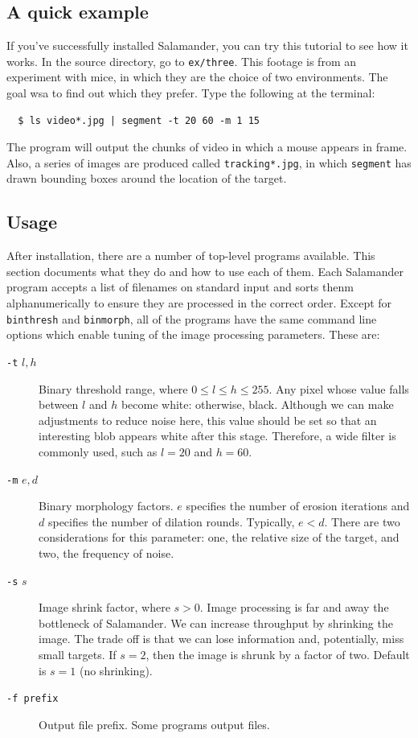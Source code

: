 \documentclass[letter]{article}
\newcounter{foot}
\begin{document}
\subsection{A quick example} 
If you've successfully installed Salamander, you can try this tutorial to see how it 
works. In the source directory, go to \texttt{ex/three}. This footage is from an 
experiment with mice, in which they are the choice of two environments. The goal 
wsa to find out which they prefer. Type the following at the terminal:
\begin{verbatim}
  $ ls video*.jpg | segment -t 20 60 -m 1 15 
\end{verbatim}
The program will output the chunks of video in which a mouse appears in frame. Also,
a series of images are produced called \texttt{tracking*.jpg}, in which \texttt{segment}
has drawn bounding boxes around the location of the target. 

\subsection{Usage} 
After installation, there are a number of top-level programs available. This section
documents what they do and how to use each of them. Each Salamander program accepts a 
list of filenames on standard input and sorts thenm alphanumerically to ensure they are 
processed in the correct order. Except for \texttt{binthresh} and \texttt{binmorph}, 
all of the programs have the same command line options which enable tuning of the 
image processing parameters. These are: 
\begin{description}
  \item[\texttt{-t} $l, h$] Binary threshold range, where $0 \le l \le h \le 255$. Any 
   pixel whose value falls between $l$ and $h$ become white: otherwise, black. Although
   we can make adjustments to reduce noise here, this value should be set so that an 
   interesting blob appears white after this stage. Therefore, a wide filter is commonly 
   used, such as $l=20$ and $h=60$. 
   
  \item[\texttt{-m} $e, d$] Binary morphology factors. $e$ specifies the number of 
   erosion iterations and $d$ specifies the number of dilation rounds. Typically, 
   $e < d$. There are two considerations for this parameter: one, the relative size 
   of the target, and two, the frequency of noise.
   
  \item[\texttt{-s} $s$] Image shrink factor, where $s > 0$. Image processing is far 
   and away the bottleneck of Salamander. We can increase throughput by shrinking the
   image. The trade off is that we can lose information and, potentially, miss small 
   targets. If $s=2$, then the image is shrunk by a factor of two. Default is $s=1$ 
   (no shrinking). 
   
  \item[\texttt{-f prefix}] Output file prefix. Some programs output files. 
\end{description}
\end{document}
